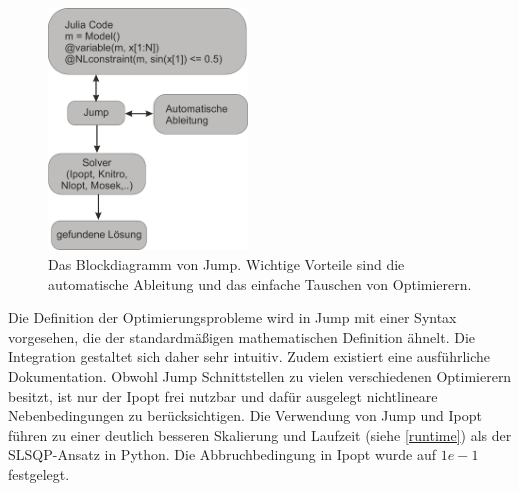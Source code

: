 \documentclass{like}
\begin{document}
\begin{figure}[ht!]
	\centering
	\includegraphics[width=150pt]{Abbildungen/jumpDiagram.png}
	\caption{Das Blockdiagramm von \ac{Jump}. Wichtige Vorteile sind die automatische Ableitung und das einfache Tauschen von Optimierern.}
	\label{fig:jumpDiagram}
\end{figure}

Die Definition der Optimierungsprobleme wird in Jump mit einer Syntax vorgesehen, die der standardmäßigen mathematischen Definition ähnelt. Die Integration gestaltet sich daher sehr intuitiv.  Zudem existiert eine ausführliche Dokumentation.
Obwohl \ac{Jump} Schnittstellen zu vielen verschiedenen Optimierern besitzt, ist nur der \ac{Ipopt} frei nutzbar und dafür ausgelegt nichtlineare Nebenbedingungen zu berücksichtigen. Die Verwendung von \ac{Jump} und \ac{Ipopt} führen zu einer deutlich besseren Skalierung und Laufzeit (siehe \ref{runtime}) als der \ac{SLSQP}-Ansatz in Python. Die Ab\-bruch\-be\-din\-gung in \ac{Ipopt} wurde auf $1e-1$ festgelegt.
\end{document}
